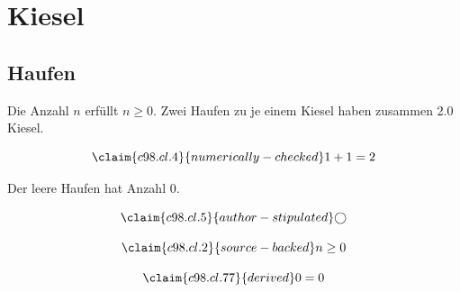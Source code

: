 \chapter{Kiesel}\label{c98}
\section{Haufen}\label{c98.s1}

\begin{theorem}[Anzahl]\label{c98.thm.count}
  Die Anzahl $n$ erfüllt $n \geq 0$.
  Zwei Haufen zu je einem Kiesel haben zusammen
  \num[c98.cl.4]{2.0}{} Kiesel.
\end{theorem}

\begin{equation}\label{c98.eq.sum}\claim{c98.cl.4}{numerically-checked}
  1 + 1 = 2
\end{equation}

\begin{lemma}[Leer]\label{c98.lem.empty}
  Der leere Haufen hat Anzahl $0$.
\end{lemma}

\begin{equation}\label{c98.eq.circle}\claim{c98.cl.5}{author-stipulated}
  \bigcirc
\end{equation}

\begin{vertiefung}[id=c98.v1, titel={T}, wozu={W}, voraussetzung={V}, zurueck={Z}]
  \begin{equation}\label{c98.eq.page}\claim{c98.cl.2}{source-backed}
    n \geq 0
  \end{equation}
\end{vertiefung}

\begin{equation}\label{c98.eq.x}\claim{c98.cl.77}{derived}
  0 = 0
\end{equation}
